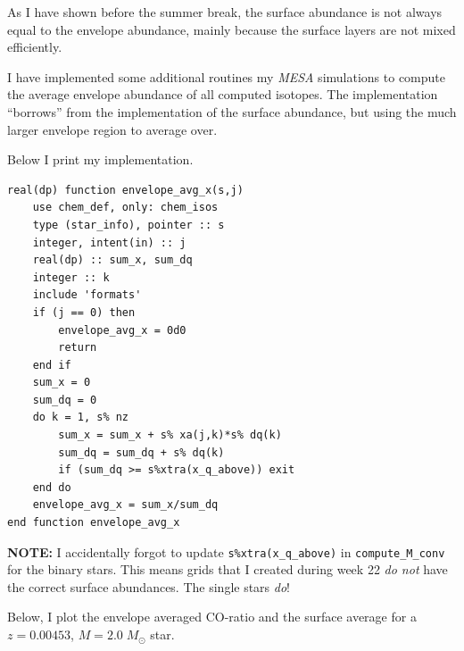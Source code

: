 \documentclass[a4paper,10pt]{article}
\begin{document}

As I have shown before the summer break, the surface abundance is not always equal to the envelope abundance, mainly because the surface layers are not mixed efficiently.

I have implemented some additional routines my \emph{MESA} simulations to compute the average envelope abundance of all computed isotopes.
The implementation ``borrows'' from the implementation of the surface abundance, but using the much larger envelope region to average over.

Below I print my implementation.
\begin{verbatim}
real(dp) function envelope_avg_x(s,j)
    use chem_def, only: chem_isos
    type (star_info), pointer :: s
    integer, intent(in) :: j
    real(dp) :: sum_x, sum_dq
    integer :: k
    include 'formats'
    if (j == 0) then
        envelope_avg_x = 0d0
        return
    end if
    sum_x = 0
    sum_dq = 0
    do k = 1, s% nz
        sum_x = sum_x + s% xa(j,k)*s% dq(k)
        sum_dq = sum_dq + s% dq(k)
        if (sum_dq >= s%xtra(x_q_above)) exit
    end do
    envelope_avg_x = sum_x/sum_dq
end function envelope_avg_x
\end{verbatim}

\begin{questionbox}{}{}
\textbf{\textcolor{keywordscolor}{NOTE:}}
    I accidentally forgot to update \texttt{s\%xtra(x\_q\_above)} in \texttt{compute\_M\_conv} for the binary stars. This means grids that I created during week 22 \emph{do not} have the correct surface abundances. The single stars \emph{do}! 
\end{questionbox}

Below, I plot the envelope averaged CO-ratio and the surface average for a  \(z = 0.00453\), \(M = 2.0\;M_\odot \) star.
\begin{figure}[ht]
    \centering
\end{figure}
\end{document}
